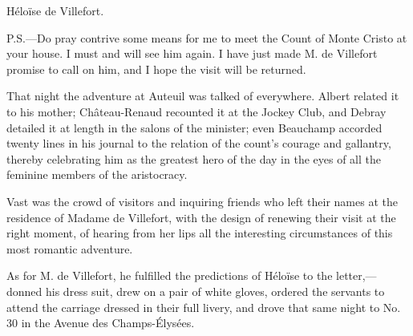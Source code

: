 Héloïse de Villefort.

P.S.—Do pray contrive some means for me to meet the Count of Monte
Cristo at your house. I must and will see him again. I have just made
M. de Villefort promise to call on him, and I hope the visit will be
returned.

That night the adventure at Auteuil was talked of everywhere. Albert
related it to his mother; Château-Renaud recounted it at the Jockey
Club, and Debray detailed it at length in the salons of the minister;
even Beauchamp accorded twenty lines in his journal to the relation of
the count’s courage and gallantry, thereby celebrating him as the
greatest hero of the day in the eyes of all the feminine members of the
aristocracy.

Vast was the crowd of visitors and inquiring friends who left their
names at the residence of Madame de Villefort, with the design of
renewing their visit at the right moment, of hearing from her lips all
the interesting circumstances of this most romantic adventure.

As for M. de Villefort, he fulfilled the predictions of Héloïse to the
letter,—donned his dress suit, drew on a pair of white gloves, ordered
the servants to attend the carriage dressed in their full livery, and
drove that same night to No. 30 in the Avenue des Champs-Élysées.
